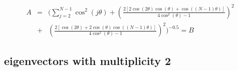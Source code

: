 \documentclass[12pt]{report}
\begin{document}
\begin{eqnarray*}
A &=& (\sum_{j=2}^{N-1}\cos^2(j\theta) +\left(\frac{2[2\cos(2\theta)\cos(\theta)+\cos((N-1)\theta)]}{4\cos^2(\theta)-1}\right)^2\\   &+&\left(\frac{2[\cos(2\theta)+2\cos(\theta)\cos((N-1)\theta)]}{4\cos^2(\theta)-1}\right)^2 )^{-0.5} = B
\end{eqnarray*}
  
 \subsection{eigenvectors with multiplicity 2}\label{subsection_eigenvaluesWithMultiplicity2} 

\end{document}
